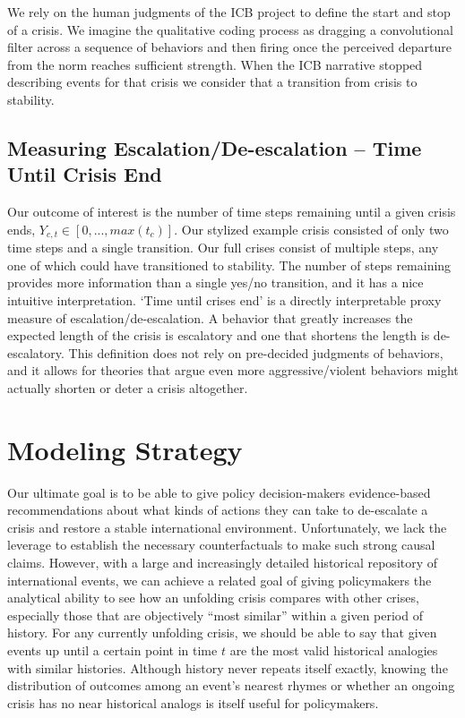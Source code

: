 \documentclass[
]{article}
\begin{document}
We rely on the human judgments of the ICB project to define the start
and stop of a crisis. We imagine the qualitative coding process as
dragging a convolutional filter across a sequence of behaviors and then
firing once the perceived departure from the norm reaches sufficient
strength. When the ICB narrative stopped describing events for that
crisis we consider that a transition from crisis to stability.

\subsection{Measuring Escalation/De-escalation -- Time Until Crisis
End}\label{measuring-escalationde-escalation-time-until-crisis-end}

Our outcome of interest is the number of time steps remaining until a
given crisis ends, \(Y_{c,t}\in [0,...,max(t_c)]\). Our stylized example
crisis consisted of only two time steps and a single transition. Our
full crises consist of multiple steps, any one of which could have
transitioned to stability. The number of steps remaining provides more
information than a single yes/no transition, and it has a nice intuitive
interpretation. `Time until crises end' is a directly interpretable
proxy measure of escalation/de-escalation. A behavior that greatly
increases the expected length of the crisis is escalatory and one that
shortens the length is de-escalatory. This definition does not rely on
pre-decided judgments of behaviors, and it allows for theories that
argue even more aggressive/violent behaviors might actually shorten or
deter a crisis altogether.

\section{Modeling Strategy}\label{modeling-strategy}

Our ultimate goal is to be able to give policy decision-makers
evidence-based recommendations about what kinds of actions they can take
to de-escalate a crisis and restore a stable international environment.
Unfortunately, we lack the leverage to establish the necessary
counterfactuals to make such strong causal claims. However, with a large
and increasingly detailed historical repository of international events,
we can achieve a related goal of giving policymakers the analytical
ability to see how an unfolding crisis compares with other crises,
especially those that are objectively ``most similar'' within a given
period of history. For any currently unfolding crisis, we should be able
to say that given events up until a certain point in time \(t\) are the
most valid historical analogies with similar histories. Although history
never repeats itself exactly, knowing the distribution of outcomes among
an event's nearest rhymes or whether an ongoing crisis has no near
historical analogs is itself useful for policymakers.
\end{document}
